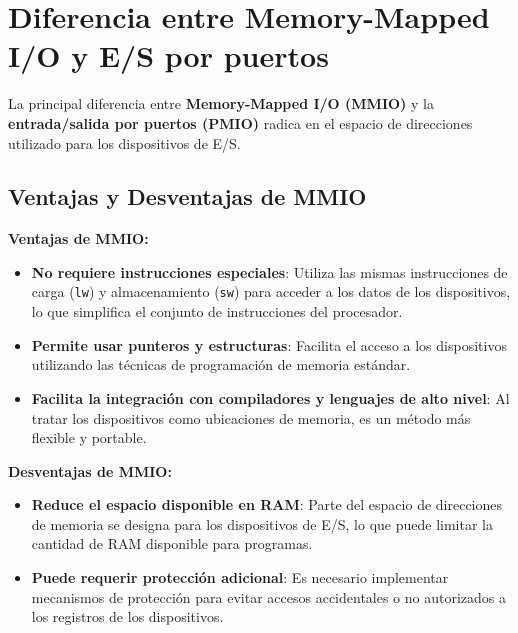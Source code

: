 \documentclass{article}
\begin{document}
	
	\section{Diferencia entre Memory-Mapped I/O y E/S por puertos}
	
	La principal diferencia entre \textbf{Memory-Mapped I/O (MMIO)} y la \textbf{entrada/salida por puertos (PMIO)} radica en el espacio de direcciones utilizado para los dispositivos de E/S.
	
	\subsection{Ventajas y Desventajas de MMIO}
	\textbf{Ventajas de MMIO:}
	\begin{itemize}
		\item \textbf{No requiere instrucciones especiales}: Utiliza las mismas instrucciones de carga (\texttt{lw}) y almacenamiento (\texttt{sw}) para acceder a los datos de los dispositivos, lo que simplifica el conjunto de instrucciones del procesador.
		\item \textbf{Permite usar punteros y estructuras}: Facilita el acceso a los dispositivos utilizando las técnicas de programación de memoria estándar.
		\item \textbf{Facilita la integración con compiladores y lenguajes de alto nivel}: Al tratar los dispositivos como ubicaciones de memoria, es un método más flexible y portable.
	\end{itemize}
	\textbf{Desventajas de MMIO:}
	\begin{itemize}
		\item \textbf{Reduce el espacio disponible en RAM}: Parte del espacio de direcciones de memoria se designa para los dispositivos de E/S, lo que puede limitar la cantidad de RAM disponible para programas.
		\item \textbf{Puede requerir protección adicional}: Es necesario implementar mecanismos de protección para evitar accesos accidentales o no autorizados a los registros de los dispositivos.
	\end{itemize}
	
\end{document}
